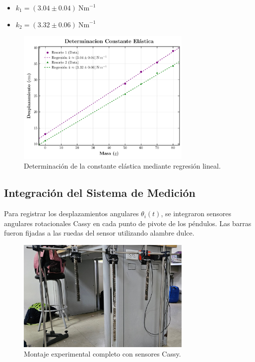 \begin{itemize}
    \item $k_1 = (3.04 \pm 0.04)~\mathrm{Nm}^{-1}$
    \item $k_2 = (3.32 \pm 0.06)~\mathrm{Nm}^{-1}$
\end{itemize}

\begin{figure}[h!]
    \centering
    \includegraphics[width=0.75\textwidth]{Figures/springs-plot.pdf}
    \caption{Determinación de la constante elástica mediante regresión lineal.}
    \label{fig:regresion}
\end{figure}

\subsection{Integración del Sistema de Medición}

Para registrar los desplazamientos angulares $\theta_i(t)$, se integraron sensores angulares rotacionales Cassy en cada punto de pivote de los péndulos. Las barras fueron fijadas a las ruedas del sensor utilizando alambre dulce.

\begin{figure}[h!]
    \centering
    \includegraphics[width=0.75\textwidth]{Figures/set-up.jpeg}
    \caption{Montaje experimental completo con sensores Cassy.}
    \label{fig:montaje}
\end{figure}

